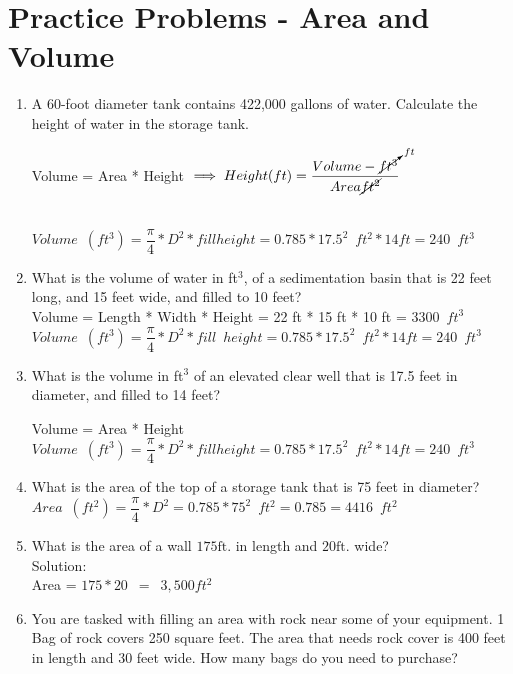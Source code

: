 \section*{Practice Problems - Area and Volume}
\begin{enumerate}
\item A 60-foot diameter tank contains 422,000 gallons of water. Calculate the height of water in the storage tank.

Volume = Area * Height $\implies Height (ft) =\dfrac{Volume - \cancelto{ft}{ft^3}}{Area \cancel{ft^2}}$\\
\vspace{0.2cm}
\

$ Volume \enspace (ft^3) = \dfrac{\pi}{4}*D^2 * fill height = 0.785*17.5^2 \enspace ft^2 * 14 ft=\boxed{240\enspace ft^3}$


\item What is the volume of water in ft$^3$, of a sedimentation basin that is 22 feet long, and 15 feet wide, and filled to 10 feet?\\

Volume = Length * Width * Height = 22 ft * 15 ft * 10 ft = $\boxed{3300 \enspace ft^3}$\\
\vspace{0.2cm}
$ Volume \enspace (ft^3) = \dfrac{\pi}{4}*D^2 * fill \enspace height = 0.785*17.5^2 \enspace ft^2 * 14 ft=\boxed{240\enspace ft^3}$

\item What is the volume in ft$^3$ of an elevated clear well that is 17.5 feet in diameter, and filled to 14 feet?

Volume = Area * Height\\
\vspace{0.2cm}
$ Volume \enspace (ft^3) = \dfrac{\pi}{4}*D^2 * fill height = 0.785*17.5^2 \enspace ft^2 * 14 ft=\boxed{240\enspace ft^3}$

\item What is the area of the top of a storage tank that is 75 feet in diameter?\\

$Area \enspace (ft^2)= \dfrac{\pi}{4}*D^2= 0.785*75^2 \enspace ft^2=0.785 = \boxed{4416\enspace ft^2}$\\
\vspace{0.2cm}

\item  What is the area of a wall $175 \mathrm{ft}$. in length and $20 \mathrm{ft}$. wide?\\
\vspace{0.2cm}
Solution:\\
\vspace{0.2cm}
Area = $175 * 20 \enspace = \enspace \boxed{3,500 ft^2}$
\vspace{0.2cm}
\item  You are tasked with filling an area with rock near some of your equipment. 1 Bag of rock covers 250 square feet. The area that needs rock cover is 400 feet in length and 30 feet wide. How many bags do you need to purchase?\\


\end{enumerate}
